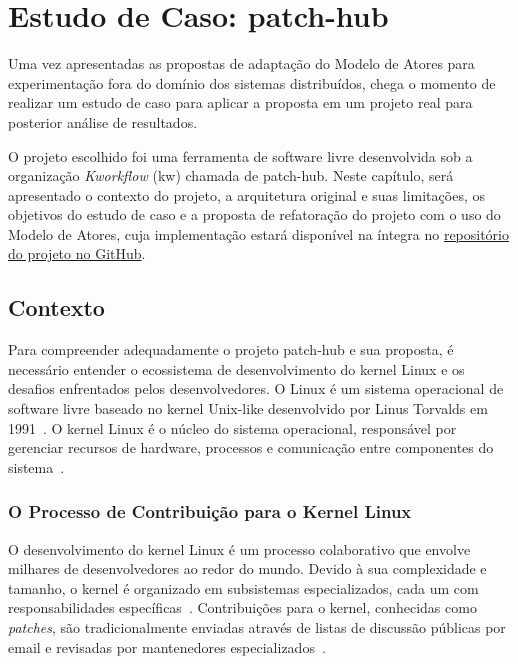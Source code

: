 \chapter{Estudo de Caso: patch-hub}

Uma vez apresentadas as propostas de adaptação do Modelo de Atores para experimentação fora do domínio dos sistemas distribuídos, chega o momento de realizar um estudo de caso para aplicar a proposta em um projeto real para posterior análise de resultados. 

O projeto escolhido foi uma ferramenta de software livre desenvolvida sob a organização \textit{Kworkflow} (kw) chamada de patch-hub. Neste capítulo, será apresentado o contexto do projeto, a arquitetura original e suas limitações, os objetivos do estudo de caso e a proposta de refatoração do projeto com o uso do Modelo de Atores, cuja implementação estará disponível na íntegra no \href{https://github.com/nahharris/ph-actors-tcc}{repositório do projeto no GitHub}.

\section{Contexto}

Para compreender adequadamente o projeto patch-hub e sua proposta, é necessário entender o ecossistema de desenvolvimento do kernel Linux e os desafios enfrentados pelos desenvolvedores. O Linux é um sistema operacional de software livre baseado no kernel Unix-like desenvolvido por Linus Torvalds em 1991~\citep{linux_wikipedia}. O kernel Linux é o núcleo do sistema operacional, responsável por gerenciar recursos de hardware, processos e comunicação entre componentes do sistema~\citep{kernel_wikipedia}.

\subsection{O Processo de Contribuição para o Kernel Linux}

O desenvolvimento do kernel Linux é um processo colaborativo que envolve milhares de desenvolvedores ao redor do mundo. Devido à sua complexidade e tamanho, o kernel é organizado em subsistemas especializados, cada um com responsabilidades específicas~\citep{kernel_subsystems}. Contribuições para o kernel, conhecidas como \textit{patches}, são tradicionalmente enviadas através de listas de discussão públicas por email e revisadas por mantenedores especializados~\citep{kernel_patches}. 

